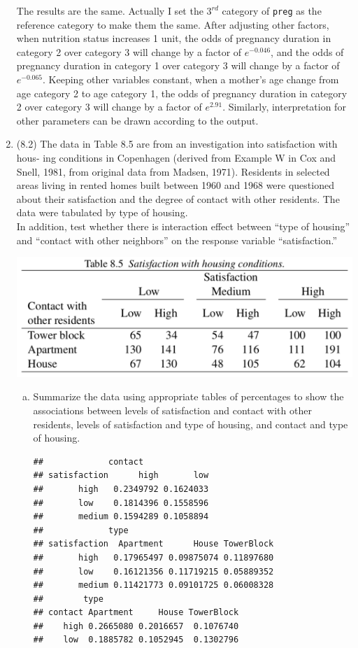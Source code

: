 \documentclass[12pt,fleqn]{article}\usepackage[]{graphicx}\usepackage[]{color}
\makeatletter
\newenvironment{kframe}{%
 \def\at@end@of@kframe{}%
 \ifinner\ifhmode%
  \def\at@end@of@kframe{\end{minipage}}%
  \begin{minipage}{\columnwidth}%
 \fi\fi%
 \def\FrameCommand##1{\hskip\@totalleftmargin \hskip-\fboxsep
 \colorbox{shadecolor}{##1}\hskip-\fboxsep
     \hskip-\linewidth \hskip-\@totalleftmargin \hskip\columnwidth}%
 \MakeFramed {\advance\hsize-\width
   \@totalleftmargin\z@ \linewidth\hsize
   \@setminipage}}%
 {\par\unskip\endMakeFramed%
 \at@end@of@kframe}
\newenvironment{knitrout}{}{} %
\theoremstyle{definition}
\makeatother
\begin{document}
\begin{enumerate}[1.]
    The results are the same. Actually I set the $3^{rd}$ category of \texttt{preg} as the reference category to make them the same. After adjusting other factors, when nutrition status increases 1 unit, the odds of pregnancy duration in category 2 over category 3 will change by a factor of $e^{-0.046}$, and the odds of pregnancy duration in category 1 over category 3 will change by a factor of $e^{-0.065}$. Keeping other variables constant, when a mother's age change from age category 2 to age category 1, the odds of pregnancy duration in category 2 over category 3 will change by a factor of $e^{2.91}$. Similarly, interpretation for other parameters can be drawn according to the output.
    \item (8.2) The data in Table 8.5 are from an investigation into satisfaction with hous- ing conditions in Copenhagen (derived from Example W in Cox and Snell, 1981, from original data from Madsen, 1971). Residents in selected areas living in rented homes built between 1960 and 1968 were questioned about their satisfaction and the degree of contact with other residents. The data were tabulated by type of housing.\\
        In addition, test whether there is interaction effect between “type of housing” and “contact with other neighbors” on the response variable “satisfaction.”\\[-25pt]
    \begin{center}
      \includegraphics[width=0.7\linewidth]{table.png}
    \end{center}
      \begin{enumerate}[a.]
        \item Summarize the data using appropriate tables of percentages to show the associations between levels of satisfaction and contact with other residents, levels of satisfaction and type of housing, and contact and type of housing.
\begin{knitrout}
\color{fgcolor}\begin{kframe}
\begin{verbatim}
##             contact
## satisfaction      high       low
##       high   0.2349792 0.1624033
##       low    0.1814396 0.1558596
##       medium 0.1594289 0.1058894
##             type
## satisfaction  Apartment      House TowerBlock
##       high   0.17965497 0.09875074 0.11897680
##       low    0.16121356 0.11719215 0.05889352
##       medium 0.11421773 0.09101725 0.06008328
##        type
## contact Apartment     House TowerBlock
##    high 0.2665080 0.2016657  0.1076740
##    low  0.1885782 0.1052945  0.1302796
\end{verbatim}
\end{kframe}
\end{knitrout}


\end{enumerate}
\end{enumerate}
\end{document}
